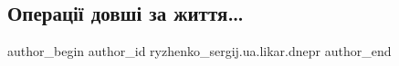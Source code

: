  
 
 
 
 

\subsection{Операції довші за життя…}
\label{sec:01_11_2022.fb.ryzhenko_sergij.ua.likar.dnepr.1.operats__dovsh__za_}

\ifcmt
 author_begin
   author_id ryzhenko_sergij.ua.likar.dnepr
 author_end
\fi
